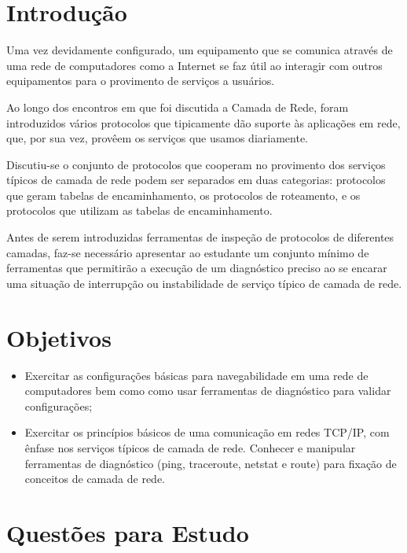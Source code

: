 \section{Introdução}

Uma vez devidamente configurado, um equipamento que se comunica através de uma rede de
computadores como a Internet se faz útil ao interagir com outros equipamentos para o provimento
de serviços a usuários.

Ao longo dos encontros em que foi discutida a Camada de Rede, foram introduzidos vários
protocolos que tipicamente dão suporte às aplicações em rede, que, por sua vez, provêem os
serviços que usamos diariamente.

Discutiu-se o conjunto de protocolos que cooperam no provimento dos serviços típicos de camada
de rede podem ser separados em duas categorias: protocolos que geram tabelas de encaminhamento,
os protocolos de roteamento, e os protocolos que utilizam as tabelas de encaminhamento.

Antes de serem introduzidas ferramentas de inspeção de protocolos de diferentes camadas, faz-se
necessário apresentar ao estudante um conjunto mínimo de ferramentas que permitirão a execução
de um diagnóstico preciso ao se encarar uma situação de interrupção ou instabilidade de serviço
típico de camada de rede.

\section{Objetivos}

\begin{itemize}
  \item Exercitar as configurações básicas para navegabilidade em uma rede de computadores bem como
    como usar ferramentas de diagnóstico para validar configurações;
  \item Exercitar os princípios básicos de uma comunicação em redes TCP/IP, com ênfase nos serviços
    típicos de camada de rede. Conhecer e manipular ferramentas de diagnóstico (ping,
    traceroute, netstat e route) para fixação de conceitos de camada de rede.
\end{itemize}

\section{Questões para Estudo}

